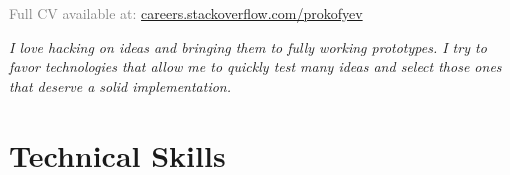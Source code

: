 \documentclass[11pt,a4paper]{moderncv}
\begin{document}
\textcolor{grey}{Full CV available at: \href{http://careers.stackoverflow.com/prokofyev}{careers.stackoverflow.com/prokofyev}}\\
\maketitle

{\large\textit{I love hacking on ideas and bringing them to fully working prototypes. I try to favor technologies that allow me to quickly test many ideas and select those ones that deserve a solid implementation.}}
\vspace{0.5cm}

\section{Technical Skills}

\end{document}

